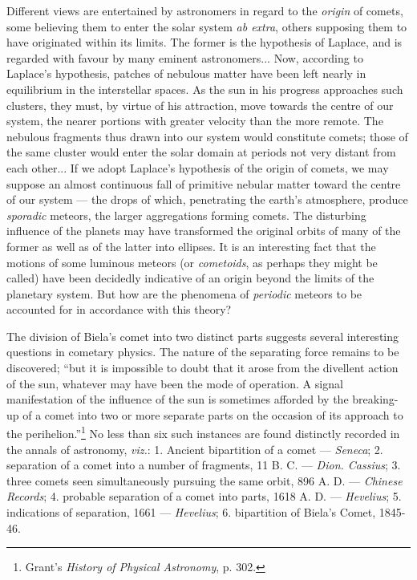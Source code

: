 \documentclass[a4paper, 12pt, oneside, polutonikogreek, english]{article}
\begin{document}
Different views are entertained by astronomers in regard to the \emph{origin} of comets, some believing them to enter the solar system \emph{ab extra}, others supposing them to have originated within its limits. The former is the hypothesis of Laplace, and is regarded with favour by many eminent astronomers... Now, according to Laplace's hypothesis, patches of nebulous matter have been left nearly in equilibrium in the interstellar spaces. As the sun in his progress approaches such clusters, they must, by virtue of his attraction, move towards the centre of our system, the nearer portions with greater velocity than the more remote. The nebulous fragments thus drawn into our system would constitute comets; those of the same cluster would enter the solar domain at periods not very distant from each other... If we adopt Laplace's hypothesis of the origin of comets, we may suppose an almost continuous fall of primitive nebular matter toward the centre of our system --- the drops of which, penetrating the earth's atmosphere, produce \emph{sporadic} meteors, the larger aggregations forming comets. The disturbing influence of the planets may have transformed the original orbits of many of the former as well as of the latter into ellipses. It is an interesting fact that the motions of some luminous meteors (or \emph{cometoids}, as perhaps they might be called) have been decidedly indicative of an origin beyond the limits of the planetary system. But how are the phenomena of \emph{periodic} meteors to be accounted for in accordance with this theory?

The division of Biela's comet into two distinct parts suggests several interesting questions in cometary physics. The nature of the separating force remains to be discovered; ``but it is impossible to doubt that it arose from the divellent action of the sun, whatever may have been the mode of operation. A signal manifestation of the influence of the sun is sometimes afforded by the breaking-up of a comet into two or more separate parts on the occasion of its approach to the perihelion.''\footnote{Grant's \emph{History of Physical Astronomy}, p. 302.} No less than six such instances are found distinctly recorded in the annals of astronomy, \emph{viz.}: 1. Ancient bipartition of a comet --- \emph{Seneca}; 2. separation of a comet into a number of fragments, 11 B. C. --- \emph{Dion. Cassius}; 3. three comets seen simultaneously pursuing the same orbit, 896 A. D. --- \emph{Chinese Records}; 4. probable separation of a comet into parts, 1618 A. D. --- \emph{Hevelius}; 5. indications of separation, 1661 --- \emph{Hevelius}; 6. bipartition of Biela's Comet, 1845-46.
\end{document}
